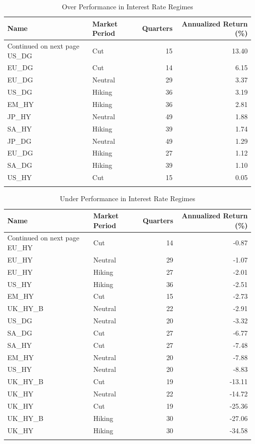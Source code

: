 \documentclass[11pt,preprint, authoryear]{elsarticle}
\numberwithin{equation}{section}
\numberwithin{figure}{section}
\numberwithin{table}{section}
\begin{document}
\begingroup\fontsize{12pt}{13pt}\selectfont
\begin{longtable}{llrr}
  \toprule
Name & Market Period & Quarters & Annualized Return (\%) \\ 
  \hline 
\endhead 
\hline 
{\footnotesize Continued on next page} 
\endfoot 
\endlastfoot 
 \midrule
US\_DG & Cut &  15 & 13.40 \\ 
  EU\_DG & Cut &  14 & 6.15 \\ 
  EU\_DG & Neutral &  29 & 3.37 \\ 
  US\_DG & Hiking &  36 & 3.19 \\ 
  EM\_HY & Hiking &  36 & 2.81 \\ 
  JP\_HY & Neutral &  49 & 1.88 \\ 
  SA\_HY & Hiking &  39 & 1.74 \\ 
  JP\_DG & Neutral &  49 & 1.29 \\ 
  EU\_DG & Hiking &  27 & 1.12 \\ 
  SA\_DG & Hiking &  39 & 1.10 \\ 
  US\_HY & Cut &  15 & 0.05 \\ 
   \bottomrule
\caption{Over Performance in Interest Rate Regimes\label{tab4}} 
\end{longtable}
\endgroup
\begingroup\fontsize{12pt}{13pt}\selectfont
\begin{longtable}{llrr}
  \toprule
Name & Market Period & Quarters & Annualized Return (\%) \\ 
  \hline 
\endhead 
\hline 
{\footnotesize Continued on next page} 
\endfoot 
\endlastfoot 
 \midrule
EU\_HY & Cut &  14 & -0.87 \\ 
  EU\_HY & Neutral &  29 & -1.07 \\ 
  EU\_HY & Hiking &  27 & -2.01 \\ 
  US\_HY & Hiking &  36 & -2.51 \\ 
  EM\_HY & Cut &  15 & -2.73 \\ 
  UK\_HY\_B & Neutral &  22 & -2.91 \\ 
  US\_DG & Neutral &  20 & -3.32 \\ 
  SA\_DG & Cut &  27 & -6.77 \\ 
  SA\_HY & Cut &  27 & -7.48 \\ 
  EM\_HY & Neutral &  20 & -7.88 \\ 
  US\_HY & Neutral &  20 & -8.83 \\ 
  UK\_HY\_B & Cut &  19 & -13.11 \\ 
  UK\_HY & Neutral &  22 & -14.72 \\ 
  UK\_HY & Cut &  19 & -25.36 \\ 
  UK\_HY\_B & Hiking &  30 & -27.06 \\ 
  UK\_HY & Hiking &  30 & -34.58 \\ 
   \bottomrule
\caption{Under Performance in Interest Rate Regimes\label{tab5}} 
\end{longtable}
\endgroup
\end{document}
